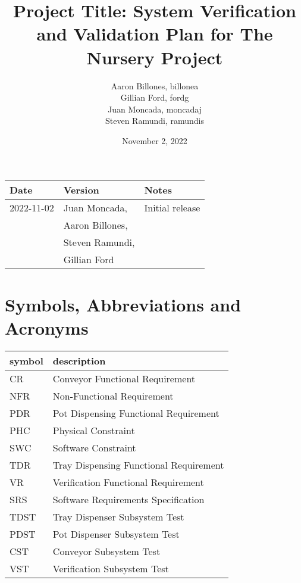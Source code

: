 \documentclass[12pt, titlepage]{article}
\begin{document}
\title{Project Title: System Verification and Validation Plan for The Nursery Project} 
\author{Aaron Billones, billonea\\Gillian Ford, fordg\\Juan Moncada, moncadaj\\Steven Ramundi, ramundis}

\date{November 2, 2022}


\maketitle
\thispagestyle{empty}




\begin{tabularx}{\textwidth}{p{3cm}p{4cm}X}
    \toprule {\bf Date} & {\bf Version} & {\bf Notes}\\
    \midrule
    2022-11-02 & Juan Moncada,& Initial release\\&Aaron Billones,\\&Steven Ramundi,\\&Gillian Ford \\
    
    \bottomrule
\end{tabularx}

\newpage

\tableofcontents

\listoftables
{}

\listoffigures
{}

\newpage

\section{Symbols, Abbreviations and Acronyms}

\renewcommand{\arraystretch}{1.2}
\begin{tabular}{l l} 
  \toprule		
  \textbf{symbol} & \textbf{description}\\
  \midrule 
  CR & Conveyor Functional Requirement\\
  NFR & Non-Functional Requirement\\
  PDR & Pot Dispensing Functional Requirement\\
  PHC & Physical Constraint\\
  SWC & Software Constraint\\
  TDR & Tray Dispensing Functional Requirement\\
  VR & Verification Functional Requirement\\
  SRS & Software Requirements Specification\\
  TDST & Tray Dispenser Subsystem Test\\
  PDST & Pot Dispenser Subsystem Test\\
  CST & Conveyor Subsystem Test\\
  VST & Verification Subsystem Test\\

  \bottomrule
\end{tabular}\\
\end{document}
